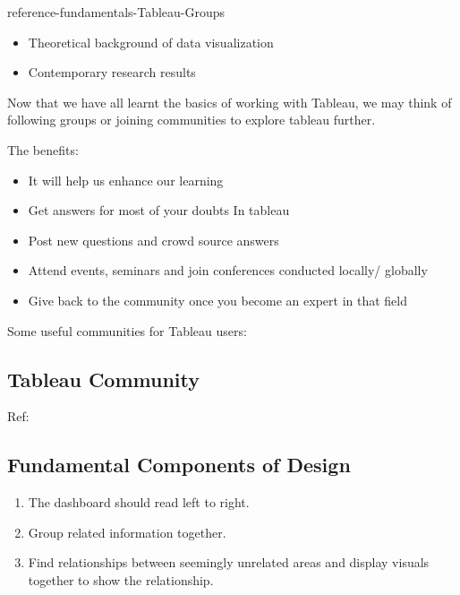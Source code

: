 \documentclass[]{book}
\providecommand{\tightlist}{%
  \setlength{\itemsep}{0pt}\setlength{\parskip}{0pt}}
\theoremstyle{definition}
\theoremstyle{definition}
\theoremstyle{definition}
\theoremstyle{remark}
\begin{document}
reference-fundamentals-Tableau-Groups

\begin{itemize}
\tightlist
\item
  Theoretical background of data visualization\\
\item
  Contemporary research results
\end{itemize}

Now that we have all learnt the basics of working with Tableau, we may
think of following groups or joining communities to explore tableau
further.

The benefits:

\begin{itemize}
\tightlist
\item
  It will help us enhance our learning
\item
  Get answers for most of your doubts In tableau
\item
  Post new questions and crowd source answers
\item
  Attend events, seminars and join conferences conducted locally/
  globally
\item
  Give back to the community once you become an expert in that field
\end{itemize}

Some useful communities for Tableau users:

\subsection{Tableau Community}\label{tableau-community}

Ref: \citep{Tableau_Community}

\subsection{Fundamental Components of
Design}\label{fundamental-components-of-design}

\begin{enumerate}
\def\labelenumi{\arabic{enumi}.}
\tightlist
\item
  The dashboard should read left to right.
\item
  Group related information together.
\item
  Find relationships between seemingly unrelated areas and display
  visuals together to show the relationship.
\end{enumerate}
\end{document}
